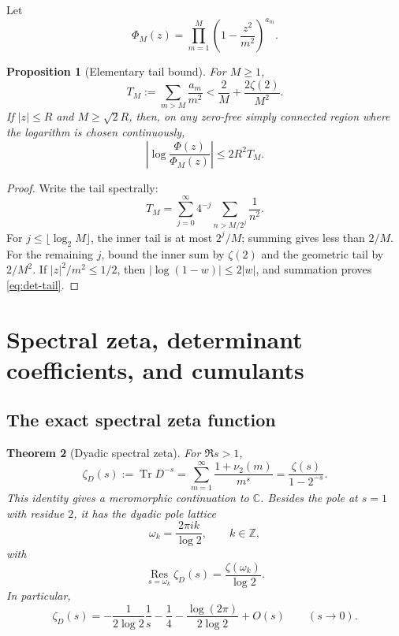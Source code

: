 \documentclass[11pt,oneside]{article}
\numberwithin{equation}{section}
\theoremstyle{plain}
\newtheorem{theorem}{Theorem}[section]
\newtheorem{proposition}[theorem]{Proposition}
\theoremstyle{definition}
\theoremstyle{remark}
\newcommand{\Tr}{\operatorname{Tr}}
\newcommand{\Res}{\operatorname*{Res}}
\newcommand{\C}{\mathbb C}
\newcommand{\Z}{\mathbb Z}
\begin{document}
Let
\[
 \Phi_M(z)=\prod_{m=1}^{M}\left(1-\frac{z^2}{m^2}\right)^{a_m}.
\]

\begin{proposition}[Elementary tail bound]\label{prop:tail}
For $M\ge1$,
\begin{equation}\label{eq:trace-tail}
 T_M:=\sum_{m>M}\frac{a_m}{m^2}
 <\frac2M+\frac{2\zeta(2)}{M^2}.
\end{equation}
If $|z|\le R$ and $M\ge\sqrt2R$, then, on any zero-free simply connected region where the logarithm is chosen continuously,
\begin{equation}\label{eq:det-tail}
 \left|\log\frac{\Phi(z)}{\Phi_M(z)}\right|
 \le2R^2T_M.
\end{equation}
\end{proposition}

\begin{proof}
Write the tail spectrally:
\[
 T_M=\sum_{j=0}^{\infty}4^{-j}
 \sum_{n>M/2^j}\frac1{n^2}.
\]
For $j\le\lfloor\log_2M\rfloor$, the inner tail is at most $2^j/M$; summing gives less than $2/M$.  For the remaining $j$, bound the inner sum by $\zeta(2)$ and the geometric tail by $2/M^2$.  If $|z|^2/m^2\le1/2$, then $|\log(1-w)|\le2|w|$, and summation proves \cref{eq:det-tail}.
\end{proof}

\section{Spectral zeta, determinant coefficients, and cumulants}

\subsection{The exact spectral zeta function}

\begin{theorem}[Dyadic spectral zeta]\label{thm:zetaD}
For $\Re s>1$,
\begin{equation}\label{eq:zetaD}
 \boxed{\ \zeta_D(s):=\Tr D^{-s}
 =\sum_{m=1}^{\infty}\frac{1+\nu_2(m)}{m^s}
 =\frac{\zeta(s)}{1-2^{-s}}.\ }
\end{equation}
This identity gives a meromorphic continuation to $\C$.  Besides the pole at $s=1$ with residue $2$, it has the dyadic pole lattice
\begin{equation}\label{eq:omega}
 \omega_k=\frac{2\pi i k}{\log2},\qquad k\in\Z,
\end{equation}
with
\begin{equation}\label{eq:zetaD-res}
 \Res_{s=\omega_k}\zeta_D(s)=\frac{\zeta(\omega_k)}{\log2}.
\end{equation}
In particular,
\begin{equation}\label{eq:zetaD-zeroexp}
 \zeta_D(s)=-\frac{1}{2\log2}\frac1s
 -\frac14-\frac{\log(2\pi)}{2\log2}+O(s)
 \qquad(s\to0).
\end{equation}
\end{theorem}
\end{document}
